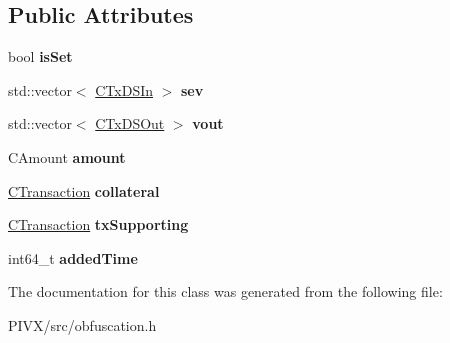 \subsection*{Public Attributes}
\begin{DoxyCompactItemize}
\item 
\mbox{\label{class_c_obfu_scation_entry_adf4dca5a54563871690ce0ac45fd0abe}} 
bool {\bfseries is\+Set}
\item 
\mbox{\label{class_c_obfu_scation_entry_a20d9590c3fe30ac6a9220967df9842df}} 
std\+::vector$<$ \mbox{\hyperlink{class_c_tx_d_s_in}{C\+Tx\+D\+S\+In}} $>$ {\bfseries sev}
\item 
\mbox{\label{class_c_obfu_scation_entry_a06dc8d953ac6c37d68e408d1451fbef1}} 
std\+::vector$<$ \mbox{\hyperlink{class_c_tx_d_s_out}{C\+Tx\+D\+S\+Out}} $>$ {\bfseries vout}
\item 
\mbox{\label{class_c_obfu_scation_entry_a9f2dd71f610c45855b4774976cadb4fc}} 
C\+Amount {\bfseries amount}
\item 
\mbox{\label{class_c_obfu_scation_entry_a418397fa2597c146f1a535ee0d5bb1c2}} 
\mbox{\hyperlink{class_c_transaction}{C\+Transaction}} {\bfseries collateral}
\item 
\mbox{\label{class_c_obfu_scation_entry_ae20f79dfe6488796932654a35627e0fb}} 
\mbox{\hyperlink{class_c_transaction}{C\+Transaction}} {\bfseries tx\+Supporting}
\item 
\mbox{\label{class_c_obfu_scation_entry_a1eb6adfe7e36c542f14c8cc654aa7f75}} 
int64\+\_\+t {\bfseries added\+Time}
\end{DoxyCompactItemize}


The documentation for this class was generated from the following file\+:\begin{DoxyCompactItemize}
\item 
P\+I\+V\+X/src/obfuscation.\+h\end{DoxyCompactItemize}
